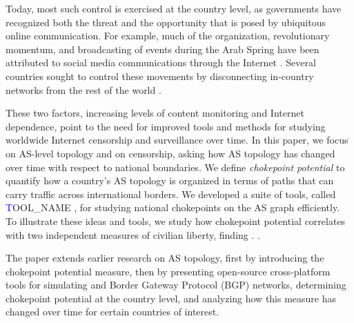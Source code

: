 \documentclass[10pt, conference, letterpaper]{IEEEtran}
\newcommand{\toolname}{{\textcolor{blue}TOOL\_NAME }}
\begin{document}
Today, most such control is exercised at the country level,
as governments have recognized both the threat and the opportunity
that is posed by ubiquitous online communication. For example, much
of the organization, revolutionary momentum, and broadcasting of
events during the Arab Spring have been attributed to social media
communications through the Internet \cite{arabspring}. Several countries
sought to control these movements by disconnecting in-country networks from the rest of the world .

These two factors, increasing levels of content monitoring and
Internet dependence, point to the need for improved tools and methods
for studying worldwide Internet censorship and surveillance over time.
  In this paper, we focus on AS-level topology and on
censorship, asking how AS topology has changed over time with respect
to national boundaries.  We define \emph{chokepoint potential} to
quantify how a country’s AS topology is organized in terms of paths
that can carry traffic across international borders.  We developed a
suite of tools, called \toolname, for studying national chokepoints on
the AS graph efficiently. To illustrate these ideas and tools, we
study how chokepoint potential correlates with two independent
measures of civilian liberty, finding . .

The paper extends earlier research on AS topology, first by introducing the chokepoint potential measure, then by presenting open-source cross-platform tools for simulating
and Border Gateway Protocol (BGP) networks, determining chokepoint potential at the country level, and analyzing how this measure has changed over time for certain countries of interest.



\end{document}
